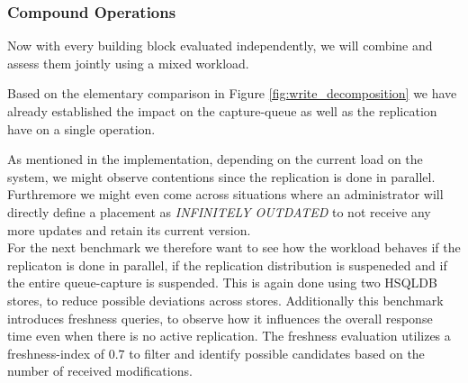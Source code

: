 \subsubsection{Compound Operations} 

Now with every building block evaluated independently, we will combine and assess them jointly using a mixed workload.



Based on the elementary comparison in Figure \ref{fig:write_decomposition} we have already established the impact on the capture-queue as well as the 
replication have on a single operation.

As mentioned in the implementation, depending on the current load on the system, we might observe contentions since the replication is done in parallel.
Furthremore we might even come across situations where an administrator will directly define a placement as \emph{INFINITELY OUTDATED} to not receive any more updates
and retain its current version.\\
For the next benchmark we therefore want to see how the workload behaves if the replicaton is done in parallel, if the replication distribution is suspeneded
and if the entire queue-capture is suspended.
This is again done using two HSQLDB stores, to reduce possible deviations across stores. 
Additionally this benchmark introduces freshness queries, to observe how it influences the overall response time even when there is no active replication. 
The freshness evaluation utilizes a freshness-index of $0.7$ to filter and identify possible candidates based on the number of received modifications.


